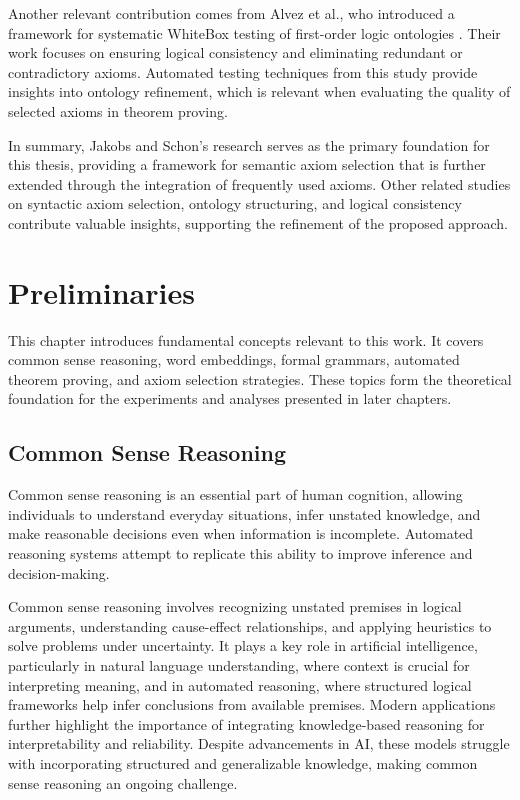 \documentclass[english,version-2020-11]{uzl-thesis}
\begin{document}
Another relevant contribution comes from Alvez et al., who introduced a framework for systematic WhiteBox testing of first-order logic ontologies \cite{Alvez2017}. Their work focuses on ensuring logical consistency and eliminating redundant or contradictory axioms. Automated testing techniques from this study provide insights into ontology refinement, which is relevant when evaluating the quality of selected axioms in theorem proving.

In summary, Jakobs and Schon's research serves as the primary foundation for this thesis, providing a framework for semantic axiom selection that is further extended through the integration of frequently used axioms. Other related studies on syntactic axiom selection, ontology structuring, and logical consistency contribute valuable insights, supporting the refinement of the proposed approach.


\chapter{Preliminaries}
\label{chapter-preliminaries}

This chapter introduces fundamental concepts relevant to this work. It covers common sense reasoning, word embeddings, formal grammars, automated theorem proving, and axiom selection strategies. These topics form the theoretical foundation for the experiments and analyses presented in later chapters.

\section{Common Sense Reasoning}

Common sense reasoning is an essential part of human cognition, allowing individuals to understand everyday situations, infer unstated knowledge, and make reasonable decisions even when information is incomplete. Automated reasoning systems attempt to replicate this ability to improve inference and decision-making.

Common sense reasoning involves recognizing unstated premises in logical arguments, understanding cause-effect relationships, and applying heuristics to solve problems under uncertainty. It plays a key role in artificial intelligence, particularly in natural language understanding, where context is crucial for interpreting meaning, and in automated reasoning, where structured logical frameworks help infer conclusions from available premises. Modern applications further highlight the importance of integrating knowledge-based reasoning for interpretability and reliability. Despite advancements in AI, these models struggle with incorporating structured and generalizable knowledge, making common sense reasoning an ongoing challenge.
\end{document}
